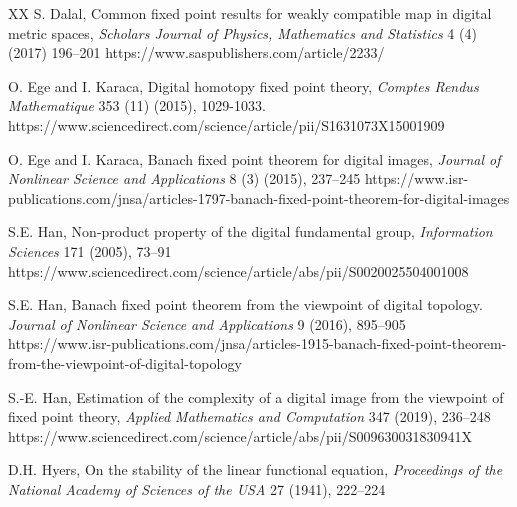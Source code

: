 \documentclass{article}
\numberwithin{thm}{section}
\begin{document}
\begin{thebibliography}{XX}
S. Dalal, Common fixed point results for weakly compatible map in digital metric
spaces, 
{\em Scholars Journal of Physics, 
Mathematics and Statistics} 4 (4) 
(2017) 196--201
\newline
https://www.saspublishers.com/article/2233/

O. Ege and I. Karaca, 
Digital homotopy fixed point theory, 
{\em Comptes Rendus
Mathematique} 353 (11) (2015), 1029-1033.
\newline
https://www.sciencedirect.com/science/article/pii/S1631073X15001909

O. Ege and I. Karaca,
Banach fixed point theorem for digital images,
{\em Journal of Nonlinear Science
and Applications} 8 (3) (2015), 
237--245 \newline
https://www.isr-publications.com/jnsa/articles-1797-banach-fixed-point-theorem-for-digital-images

S.E. Han,
Non-product property of the
digital fundamental group,
{\em Information Sciences} 171 (2005), 73--91
\newline
https://www.sciencedirect.com/science/article/abs/pii/S0020025504001008

S.E. Han, 
Banach fixed point theorem from the
viewpoint of digital topology.
{\em Journal of Nonlinear Science and
Applications} 9 (2016), 895--905 \newline
https://www.isr-publications.com/jnsa/articles-1915-banach-fixed-point-theorem-from-the-viewpoint-of-digital-topology

S.-E. Han,
Estimation of the complexity of a digital image from 
the viewpoint of fixed point theory,
{\em Applied Mathematics and Computation} 
347 (2019), 236--248
\newline
https://www.sciencedirect.com/science/article/abs/pii/S009630031830941X

D.H. Hyers,
On the stability of the linear
functional equation,
{\em Proceedings of the National
Academy of Sciences of the USA}
27 (1941), 222--224


\end{thebibliography}
\end{document}
